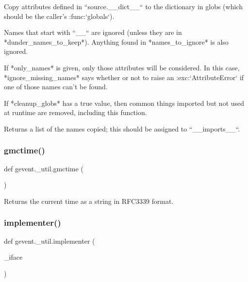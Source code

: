 \begin{DoxyVerb}Copy attributes defined in ``source.__dict__`` to the dictionary
in globs (which should be the caller's :func:`globals`).

Names that start with ``__`` are ignored (unless they are in
*dunder_names_to_keep*). Anything found in *names_to_ignore* is
also ignored.

If *only_names* is given, only those attributes will be
considered. In this case, *ignore_missing_names* says whether or
not to raise an :exc:`AttributeError` if one of those names can't
be found.

If *cleanup_globs* has a true value, then common things imported but
not used at runtime are removed, including this function.

Returns a list of the names copied; this should be assigned to ``__imports__``.
\end{DoxyVerb}
 \mbox{\label{namespacegevent_1_1__util_a79e0064c3ee2539fa1b95eb55b69a7c3}} 
\subsubsection{\texorpdfstring{gmctime()}{gmctime()}}
{\footnotesize\ttfamily def gevent.\+\_\+util.\+gmctime (\begin{DoxyParamCaption}{ }\end{DoxyParamCaption})}

\begin{DoxyVerb}Returns the current time as a string in RFC3339 format.
\end{DoxyVerb}
 \mbox{\label{namespacegevent_1_1__util_a121bd451a484928258a7fea1f9960223}} 
\subsubsection{\texorpdfstring{implementer()}{implementer()}}
{\footnotesize\ttfamily def gevent.\+\_\+util.\+implementer (\begin{DoxyParamCaption}\item[{}]{\+\_\+iface }\end{DoxyParamCaption})}


